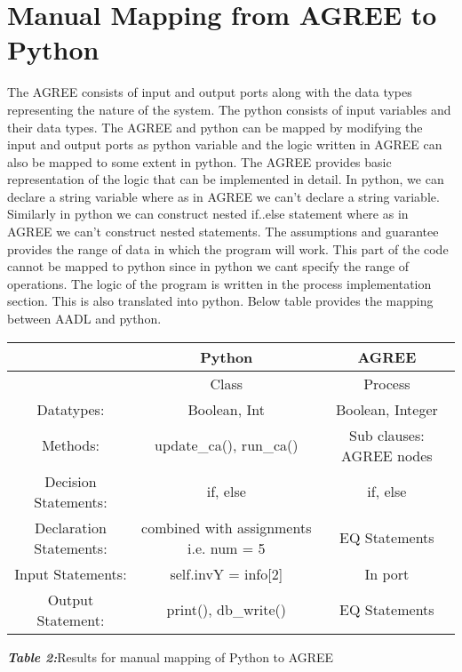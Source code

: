 \documentclass[12pt]{report}
\theoremstyle{plain}
\theoremstyle{definition}
\begin{document}
\section*{Manual Mapping from AGREE to Python}
The AGREE consists of input and output ports along with the data types representing the nature of the system. The python consists of input variables and their data types. The AGREE and python can be mapped by modifying the input and output ports as python variable and the logic written in AGREE can also be mapped to some extent in python. The AGREE provides basic representation of the logic that can be implemented in detail. In python, we can declare a string variable where as in AGREE we can’t declare a string variable. Similarly in python we can construct nested if..else statement where as in AGREE we can't construct nested statements. The assumptions and guarantee provides the range of data in which the program will work. This part of the code cannot be mapped to python since in python we cant specify the range of operations. The logic of the program is written in the process implementation section. This is also translated into python. Below table provides the mapping between AADL and python.\\
\begin{center}
 \begin{tabular}{||c c c||} 
 \hline
  & Python & AGREE \\ [0.5ex] 
 \hline\hline
 & Class & Process \\ 
 \hline
 Datatypes: & Boolean, Int & Boolean, Integer  \\
 \hline
 Methods: & update\_ca(), run\_ca() & Sub clauses: AGREE nodes \\
 \hline
 Decision Statements: &  if, else &  if, else \\
 \hline
 Declaration Statements: & combined with assignments i.e. num = 5 & EQ Statements \\
 \hline
 Input Statements: & self.invY = info[2] & In port\\ 
\hline
 Output Statement: & print(), db\_write() & EQ Statements \\[1ex]
 \hline
\end{tabular}
\centerline{\textit{\textbf{Table 2:}}Results for manual mapping of Python to AGREE}
\end{center}
                        
\end{document}
